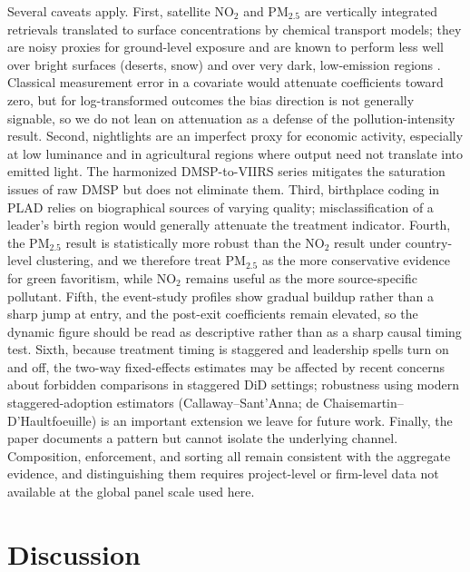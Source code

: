 \documentclass[9pt,twocolumn,twoside]{pnas-new}
\begin{document}
Several caveats apply. First, satellite NO$_2$ and PM$_{2.5}$ are vertically integrated retrievals translated to surface concentrations by chemical transport models; they are noisy proxies for ground-level exposure and are known to perform less well over bright surfaces (deserts, snow) and over very dark, low-emission regions \cite{Cooper2022NO2}. Classical measurement error in a covariate would attenuate coefficients toward zero, but for log-transformed outcomes the bias direction is not generally signable, so we do not lean on attenuation as a defense of the pollution-intensity result. Second, nightlights are an imperfect proxy for economic activity, especially at low luminance and in agricultural regions where output need not translate into emitted light. The harmonized DMSP-to-VIIRS series mitigates the saturation issues of raw DMSP \cite{Gibson2021} but does not eliminate them. Third, birthplace coding in PLAD relies on biographical sources of varying quality; misclassification of a leader's birth region would generally attenuate the treatment indicator. Fourth, the PM$_{2.5}$ result is statistically more robust than the NO$_2$ result under country-level clustering, and we therefore treat PM$_{2.5}$ as the more conservative evidence for green favoritism, while NO$_2$ remains useful as the more source-specific pollutant. Fifth, the event-study profiles show gradual buildup rather than a sharp jump at entry, and the post-exit coefficients remain elevated, so the dynamic figure should be read as descriptive rather than as a sharp causal timing test. Sixth, because treatment timing is staggered and leadership spells turn on and off, the two-way fixed-effects estimates may be affected by recent concerns about forbidden comparisons in staggered DiD settings; robustness using modern staggered-adoption estimators (Callaway--Sant'Anna; de Chaisemartin--D'Haultfoeuille) is an important extension we leave for future work. Finally, the paper documents a pattern but cannot isolate the underlying channel. Composition, enforcement, and sorting all remain consistent with the aggregate evidence, and distinguishing them requires project-level or firm-level data not available at the global panel scale used here.

\section*{Discussion}
\end{document}
